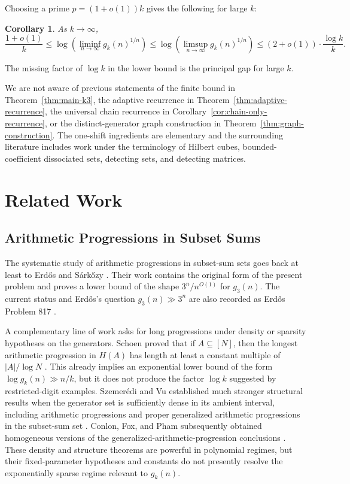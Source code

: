 \documentclass[11pt]{article}
\numberwithin{equation}{section}
\newtheorem{corollary}[theorem]{Corollary}
\theoremstyle{definition}
\theoremstyle{remark}
\begin{document}
\smallskip
\noindent
Choosing a prime $p=(1+o(1))k$ gives the following for large $k$:

\begin{corollary}\label{cor:large-k-rates}
As $k\to\infty$,
\begin{equation}\label{eq:large-k-rates}
\frac{1+o(1)}{k}
 \le \log\!\left(\liminf_{n\to\infty}g_k(n)^{1/n}\right)
 \le \log\!\left(\limsup_{n\to\infty}g_k(n)^{1/n}\right)
 \le (2+o(1))\cdot\frac{\log k}{k}.
\end{equation}
\end{corollary}

\smallskip
\noindent
The missing factor of $\log k$ in the lower bound is the principal gap for large $k$. 

\bigskip
\noindent
We are not aware of previous statements of the finite bound in Theorem~\ref{thm:main-k3}, the adaptive recurrence in Theorem~\ref{thm:adaptive-recurrence}, the universal chain recurrence in Corollary~\ref{cor:chain-only-recurrence}, or the distinct-generator graph construction in Theorem~\ref{thm:graph-construction}. The one-shift ingredients are elementary and the surrounding literature includes work under the terminology of Hilbert cubes, bounded-coefficient dissociated sets, detecting sets, and detecting matrices.

\section{Related Work}\label{sec:related}

\subsection{Arithmetic Progressions in Subset Sums}

The systematic study of arithmetic progressions in subset-sum sets goes back at least to Erd\H{o}s and S\'ark\H{o}zy \cite{ErdosSarkozy1992}. Their work contains the original form of the present problem and proves a lower bound of the shape $3^n/n^{O(1)}$ for $g_3(n)$. The current status and Erd\H{o}s's question $g_3(n)\gg3^n$ are also recorded as Erd\H{o}s Problem 817 \cite{Bloom817}.

\bigskip
\noindent
A complementary line of work asks for long progressions under density or sparsity hypotheses on the generators. Schoen proved that if $A\subseteq[N]$, then the longest arithmetic progression in $H(A)$ has length at least a constant multiple of $|A|/\log N$ \cite{Schoen2011}. This already implies an exponential lower bound of the form $\log g_k(n)\gg n/k$, but it does not produce the factor $\log k$ suggested by restricted-digit examples. Szemer\'edi and Vu established much stronger structural results when the generator set is sufficiently dense in its ambient interval, including arithmetic progressions and proper generalized arithmetic progressions in the subset-sum set \cite{SzemerediVu2006}. Conlon, Fox, and Pham subsequently obtained homogeneous versions of the generalized-arithmetic-progression conclusions \cite{ConlonFoxPham2023}. These density and structure theorems are powerful in polynomial regimes, but their fixed-parameter hypotheses and constants do not presently resolve the exponentially sparse regime relevant to $g_k(n)$.
\end{document}
